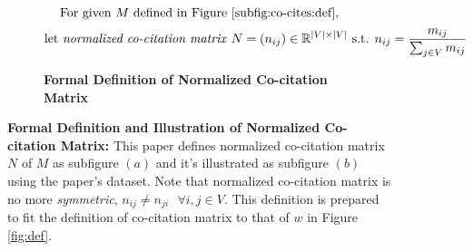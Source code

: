 \begin{figure}[]
    \begin{subfigure}[b]{1\textwidth}
        \[\text{For given $M$ defined in Figure \ref{subfig:co-cites:def},} \]
        \[\text{let \textit{normalized co-citation matrix} } N = (n_{ij}) \in \Bbb{R}^{|V| \times |V|} \text{ s.t. } n_{ij} = \frac{m_{ij}}{\sum_{j \in V}m_{ij}} \]
        \caption{\textbf{Formal Definition of Normalized Co-citation Matrix}}
        \label{subfig:co-cites:def}
    \end{subfigure}
    \vfill
    \begin{subfigure}[b]{1\textwidth}
    \end{subfigure}
    \label{fig:def-illus-co-cites}      
    \caption{\textbf{Formal Definition and Illustration of Normalized Co-citation Matrix:} This paper defines normalized co-citation matrix $N$ of $M$ as subfigure $(a)$ and it's illustrated as subfigure $(b)$ using the paper's dataset. Note that normalized co-citation matrix is no more \textit{symmetric}, $n_{ij} \neq n_{ji} \text{ } \forall i,j \in V$. This definition is prepared to fit the definition of co-citation matrix to that of $w$ in Figure \ref{fig:def}.} 
\end{figure}